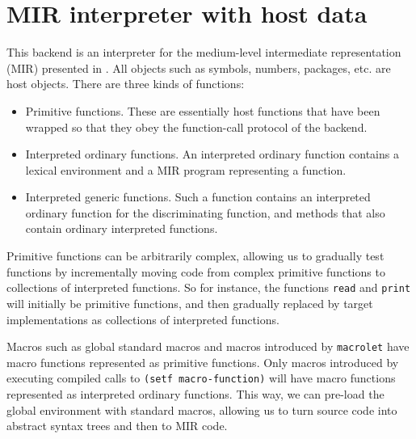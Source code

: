 \chapter{MIR interpreter with host data}

This backend is an interpreter for the medium-level intermediate
representation (MIR) presented in .  All objects
such as symbols, numbers, packages, etc. are host objects.  There are
three kinds of functions:

\begin{itemize}
\item Primitive functions.  These are essentially host functions that
  have been wrapped so that they obey the function-call protocol of
  the backend. 
\item Interpreted ordinary functions.  An interpreted ordinary
  function contains a lexical environment and a MIR program
  representing a function.  
\item Interpreted generic functions.  Such a function contains an
  interpreted ordinary function for the discriminating function, and
  methods that also contain ordinary interpreted functions. 
\end{itemize}

Primitive functions can be arbitrarily complex, allowing us to
gradually test \sysname{} functions by incrementally moving code from
complex primitive functions to collections of interpreted functions.
So for instance, the functions \texttt{read} and \texttt{print} will
initially be primitive functions, and then gradually replaced by
target implementations as collections of interpreted functions.

Macros such as global standard macros and macros introduced by
\texttt{macrolet} have macro functions represented as primitive
functions.  Only macros introduced by executing compiled calls to
\texttt{(setf macro-function)} will have macro functions represented
as interpreted ordinary functions.  This way, we can pre-load the
global environment with standard macros, allowing us to turn source
code into abstract syntax trees and then to MIR code. 
